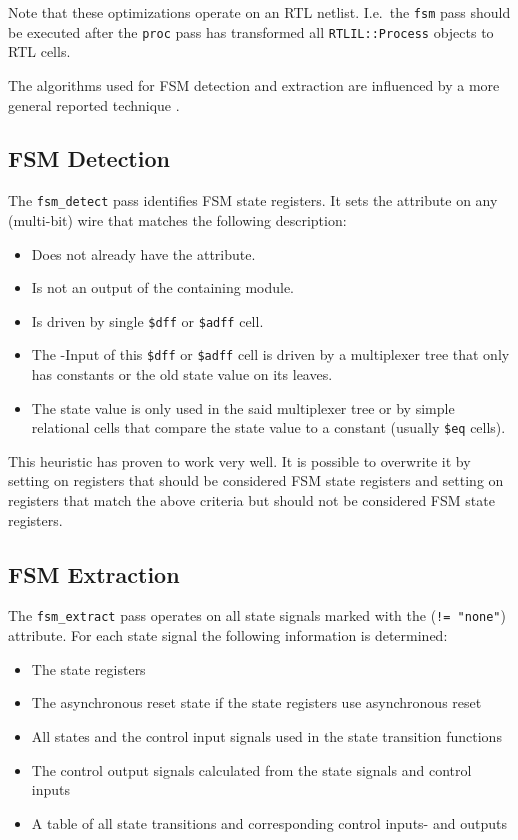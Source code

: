 Note that these optimizations operate on an RTL netlist. I.e.~the {\tt fsm} pass
should be executed after the {\tt proc} pass has transformed all
{\tt RTLIL::Process} objects to RTL cells.

The algorithms used for FSM detection and extraction are influenced by a more
general reported technique \cite{fsmextract}.

\subsection{FSM Detection}

The {\tt fsm\_detect} pass identifies FSM state registers. It sets the
 attribute on any (multi-bit) wire that matches
the following description:

\begin{itemize}
\item Does not already have the  attribute.
\item Is not an output of the containing module.
\item Is driven by single {\tt \$dff} or {\tt \$adff} cell.
\item The -Input of this {\tt \$dff} or {\tt \$adff} cell is driven by a multiplexer
tree that only has constants or the old state value on its leaves.
\item The state value is only used in the said multiplexer tree or by simple relational
cells that compare the state value to a constant (usually {\tt \$eq} cells).
\end{itemize}

This heuristic has proven to work very well. It is possible to overwrite it by setting
 on registers that should be considered FSM state registers
and setting  on registers that match the above criteria
but should not be considered FSM state registers.

\subsection{FSM Extraction}

The {\tt fsm\_extract} pass operates on all state signals marked with the
 ({\tt != "none"}) attribute. For each state signal the following
information is determined:

\begin{itemize}
\item The state registers
\item The asynchronous reset state if the state registers use asynchronous reset
\item All states and the control input signals used in the state transition functions
\item The control output signals calculated from the state signals and control inputs
\item A table of all state transitions and corresponding control inputs- and outputs
\end{itemize}

